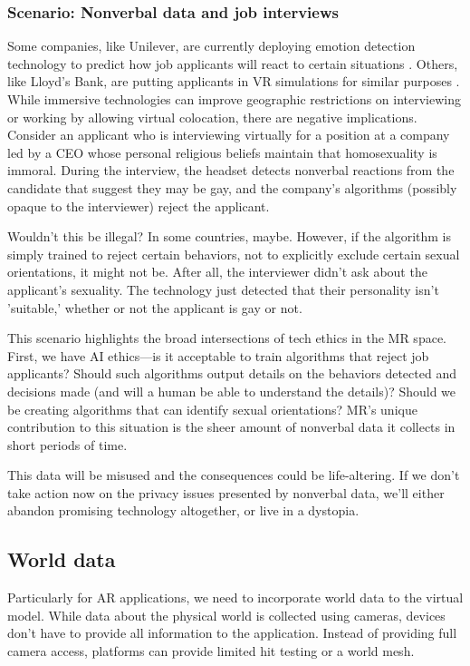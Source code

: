 \subsubsection{Scenario: Nonverbal data and job interviews}
Some companies, like Unilever, are currently deploying emotion detection technology to predict how job applicants will react to certain situations \cite{gilliland}. Others, like Lloyd's Bank, are putting applicants in VR simulations for similar purposes \cite{guardian2018how}. While immersive technologies can improve geographic restrictions on interviewing or working by allowing virtual colocation, there are negative implications. Consider an applicant who is interviewing virtually for a position at a company led by a CEO whose personal religious beliefs maintain that homosexuality is immoral. During the interview, the headset detects nonverbal reactions from the candidate that suggest they may be gay, and the company's algorithms (possibly opaque to the interviewer) reject the applicant.

Wouldn't this be illegal? In some countries, maybe. However, if the algorithm is simply trained to reject certain behaviors, not to explicitly exclude certain sexual orientations, it might not be. After all, the interviewer didn't ask about the applicant's sexuality. The technology just detected that their personality isn't 'suitable,' whether or not the applicant is gay or not.

This scenario highlights the broad intersections of tech ethics in the MR space. First, we have AI ethics---is it acceptable to train algorithms that reject job applicants? Should such algorithms output details on the behaviors detected and decisions made (and will a human be able to understand the details)? Should we be creating algorithms that can identify sexual orientations? MR's unique contribution to this situation is the sheer amount of nonverbal data it collects in short periods of time.

This data will be misused and the consequences could be life-altering. If we don't take action now on the privacy issues presented by nonverbal data, we'll either abandon promising technology altogether, or live in a dystopia.


\subsection{World data}

Particularly for AR applications, we need to incorporate world data to the virtual model. While data about the physical world is collected using cameras, devices don't have to provide all information to the application. Instead of providing full camera access, platforms can provide limited hit testing or a world mesh.

